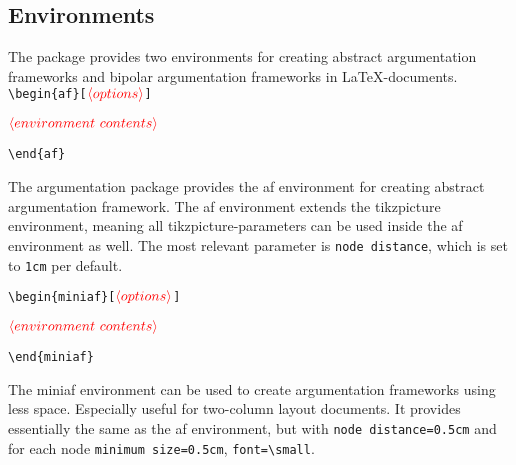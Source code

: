 \documentclass{article}
\newcommand{\opt}[1]{\ensuremath{\textcolor[rgb]{1.00,0.00,0.00}{\langle #1\rangle}}}
\begin{document}
\subsection{Environments}
The package provides two environments for creating abstract argumentation frameworks and bipolar argumentation frameworks in \LaTeX-documents.\\

\noindent
\verb|\begin{af}[|\opt{options}\verb|]|

\opt{environment~contents}

\noindent
\verb|\end{af}|

\begin{list}{}{\leftmargin=\parindent\rightmargin=0pt}
    \item
    The \textsf{argumentation} package provides the \textsf{af} environment for creating abstract argumentation framework.
    The \textsf{af} environment extends the \textsf{tikzpicture} environment, meaning all \textsf{tikzpicture}-parameters can be used inside the \textsf{af} environment as well.
    The most relevant parameter is \verb|node distance|, which is set to \verb|1cm| per default.\\
\end{list}
    
\noindent
\verb|\begin{miniaf}[|\opt{options}\verb|]|

\opt{environment~contents}

\noindent
\verb|\end{miniaf}|

\begin{list}{}{\leftmargin=\parindent\rightmargin=0pt}
    \item
    The \textsf{miniaf} environment can be used to create argumentation frameworks using less space.
    Especially useful for two-column layout documents.
    It provides essentially the same as the \textsf{af} environment, but with \verb|node distance=0.5cm| and for each node \verb|minimum size=0.5cm|, \verb|font=\small|.
\end{list}
\end{document}
